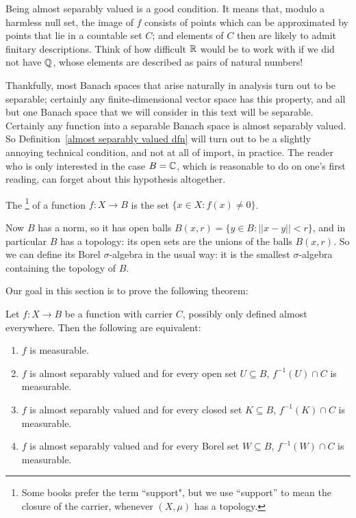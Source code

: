 \begin{subsec}
Being almost separably valued is a good condition. It means that, modulo a harmless null set, the image of $f$ consists of points which can be approximated by points that lie in a countable set $C$; and elements of $C$ then are likely to admit finitary descriptions.
Think of how difficult $\mathbb{R}$ would be to work with if we did not have $\mathbb{Q}$, whose elements are described as pairs of natural numbers!
\end{subsec}

\begin{subsec}
Thankfully, most Banach spaces that arise naturally in analysis turn out to be separable; certainly any finite-dimensional vector space has this property, and all but one Banach space that we will consider in this text will be separable.
Certainly any function into a separable Banach space is almost separably valued. So Definition~\ref{almost separably valued dfn} will turn out to be a slightly annoying technical condition, and not at all of import, in practice.
The reader who is only interested in the case $B = \mathbb{C}$, which is reasonable to do on one's first reading, can forget about this hypothesis altogether.
\end{subsec}

\begin{definition}
The \footnote{Some books prefer the term ``support", but we use ``support'' to mean the closure of the carrier, whenever $(X, \mu)$ has a topology.} of a function $f: X \to B$ is the set $\{x \in X: f(x) \neq 0\}$.
\end{definition}

\begin{subsec}
Now $B$ has a norm, so it has open balls $B(x, r) = \{y \in B: ||x - y|| < r\}$, and in particular $B$ has a topology: its open sets are the unions of the balls $B(x, r)$.
So we can define its Borel $\sigma$-algebra in the usual way: it is the smallest $\sigma$-algebra containing the topology of $B$.
\end{subsec}

\begin{subsec}
Our goal in this section is to prove the following theorem:
\end{subsec}

\begin{theorem}
\label{characterization of measurable functions}
Let $f: X \to B$ be a function with carrier $C$, possibly only defined almost everywhere. Then the following are equivalent:
\begin{enumerate}
\item $f$ is measurable.
\item $f$ is almost separably valued and for every open set $U \subseteq B$, $f^{-1}(U) \cap C$ is measurable.
\item $f$ is almost separably valued and for every closed set $K \subseteq B$, $f^{-1}(K) \cap C$ is measurable.
\item $f$ is almost separably valued and for every Borel set $W \subseteq B$, $f^{-1}(W) \cap C$ is measurable.
\end{enumerate}
\end{theorem}

